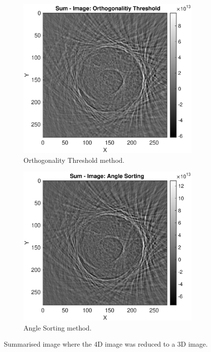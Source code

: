 \begin{figure}[H]
     \centering
     \begin{subfigure}[b]{0.49\textwidth}
         \centering
         \includegraphics[width=1.12\linewidth]{Graphics/Results/Diff_angle_sort_orthogonality/diff_ortho_bubble_sumImmage_ortho.eps}
         \caption{Orthogonality Threshold method.}
         \label{fig:res:summareized_bubble_ortho_image_ortho}
     \end{subfigure}
     \hfill
     \begin{subfigure}[b]{0.49\textwidth}
         \centering
         \includegraphics[width=1.12\textwidth]{Graphics/Results/Diff_angle_sort_orthogonality/diff_ortho_bubble_sumImmage_sort.eps}
         \caption{Angle Sorting method.}
         \label{fig:res:summareized_bubble_ortho_image_bubble}
     \end{subfigure}
        \caption{Summarised image where the 4D image was reduced to a 3D image. }
        \label{fig:res:summareized_bubble_ortho_image}
\end{figure}

